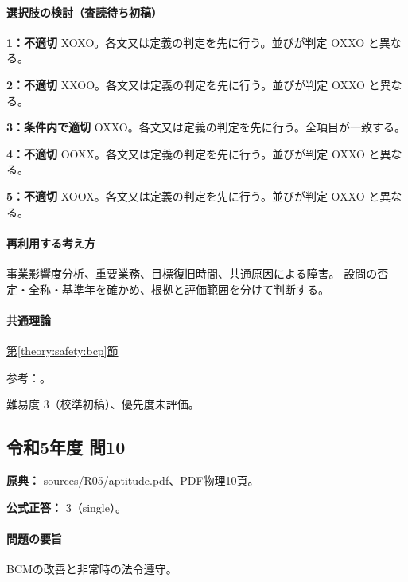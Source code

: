 \paragraph{選択肢の検討（査読待ち初稿）}\mbox{}\par

\noindent\textbf{1：不適切} XOXO。各文又は定義の判定を先に行う。並びが判定 OXXO と異なる。\par

\noindent\textbf{2：不適切} XXOO。各文又は定義の判定を先に行う。並びが判定 OXXO と異なる。\par

\noindent\textbf{3：条件内で適切} OXXO。各文又は定義の判定を先に行う。全項目が一致する。\par

\noindent\textbf{4：不適切} OOXX。各文又は定義の判定を先に行う。並びが判定 OXXO と異なる。\par

\noindent\textbf{5：不適切} XOOX。各文又は定義の判定を先に行う。並びが判定 OXXO と異なる。\par

\paragraph{再利用する考え方} 事業影響度分析、重要業務、目標復旧時間、共通原因による障害。 設問の否定・全称・基準年を確かめ、根拠と評価範囲を分けて判断する。

\paragraph{共通理論} \hyperref[theory:safety:bcp]{第\ref*{theory:safety:bcp}節}

\par 参考：\cite{eth54_bcp2013}。

\par 難易度 3（校準初稿）、優先度未評価。

\subsection{令和5年度 問10}
\label{q:r05-reg-apt-10}

\noindent\textbf{原典：} sources/R05/aptitude.pdf、PDF物理10頁。

\textbf{公式正答：} 3（single）。

\paragraph{問題の要旨} BCMの改善と非常時の法令遵守。

